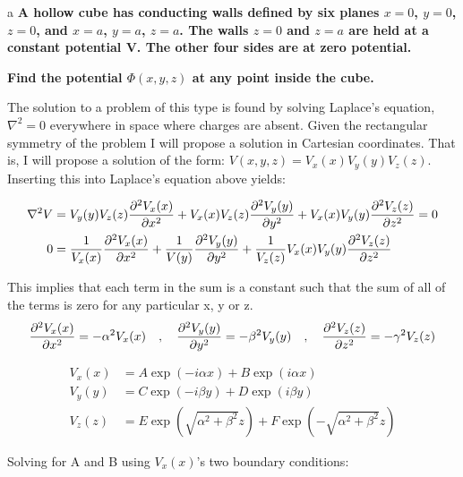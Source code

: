\begin{homeworkProblem}[Jackson ed. 3: 2.23)]

\begin{homeworkSection}{a}
\textbf{A hollow cube has conducting walls defined by six planes $x = 0$, $y = 0$, $z = 0$, and 
$x = a$, $y = a$, $z = a$. The walls $z = 0$ and $z = a$ are held at a constant potential V. 
The other four sides are at zero potential.}

\textbf{Find the potential $\Phi(x, y, z)$ at any point inside the cube.}

The solution to a problem of this type is found by solving Laplace's equation, $\nabla^2 = 0$ everywhere in space where charges are absent. Given the rectangular symmetry of the problem I will propose a solution in Cartesian coordinates. That is, I will propose a solution of the form: $V(x,y,z) = V_x(x)V_y(y)V_z(z)$. Inserting this into Laplace's equation above yields:

\begin{align}
\nabla^2 V &= V_y(y)V_z(z)\dfrac{\partial^2 {V_x(x)}}{\partial {x}^2} + V_x(x)V_z(z)\dfrac{\partial^2 {V_y(y)}}{\partial {y}^2} + V_x(x)V_y(y)\dfrac{\partial^2 {V_z(z)}}{\partial {z}^2} = 0 \nonumber \\
0 &= \dfrac{1}{V_x(x)}\dfrac{\partial^2 {V_x(x)}}{\partial {x}^2} + \dfrac{1}{V(y)}\dfrac{\partial^2 {V_y(y)}}{\partial {y}^2} + \dfrac{1}{V_z(z)}V_x(x)V_y(y)\dfrac{\partial^2 {V_z(z)}}{\partial {z}^2} \nonumber
\end{align}

This implies that each term in the sum is a constant such that the sum of all of the terms is zero for any particular x, y or z.
\[
\dfrac{\partial^2 {V_x(x)}}{\partial {x}^2} = -\alpha^2 V_x(x) \quad,\quad \dfrac{\partial^2 {V_y(y)}}{\partial {y}^2} = -\beta^2 V_y(y) \quad,\quad \dfrac{\partial^2 {V_z(z)}}{\partial {z}^2} = -\gamma^2 V_z(z) \nonumber
\]

\begin{align}
V_x(x) &= A \exp(-i \alpha x) + B \exp(i \alpha x) \nonumber \\
V_y(y) &= C \exp(-i \beta y) + D \exp(i \beta y) \nonumber \\
V_z(z) &= E \exp(\sqrt{\alpha^2+\beta^2} z) + F \exp(-\sqrt{\alpha^2+\beta^2} z) \nonumber
\end{align}

Solving for A and B using $V_x(x)$'s two boundary conditions:


\end{homeworkSection}
\end{homeworkProblem}

